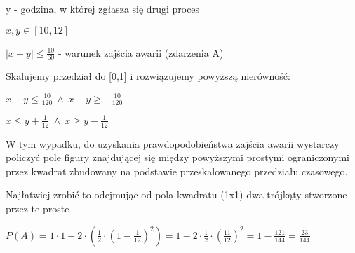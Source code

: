 \documentclass[fleqn]{article}
\begin{document}
y - godzina, w której zgłasza się drugi proces

$x,y \in [10,12]$

$|x-y|\le\frac{10}{60}$ - warunek zajścia awarii (zdarzenia A)

Skalujemy przedział do [0,1] i rozwiązujemy powyższą nierówność:

$x-y\le\frac{10}{120} \ \wedge \ x-y\ge-\frac{10}{120}$

$x\le y+\frac{1}{12} \ \wedge \ x\ge y-\frac{1}{12}$

W tym wypadku, do uzyskania prawdopodobieństwa zajścia awarii wystarczy policzyć pole figury znajdującej się między powyższymi prostymi ograniczonymi przez kwadrat zbudowany na podstawie przeskalowanego przedziału czasowego.

Najłatwiej zrobić to odejmując od pola kwadratu (1x1) dwa trójkąty stworzone przez te proste

$P(A)=1\cdot1-2\cdot(\frac{1}{2}\cdot(1-\frac{1}{12})^{2})=1-2\cdot\frac{1}{2}\cdot(\frac{11}{12})^{2}=1-\frac{121}{144}=\frac{23}{144}$
\end{document}

